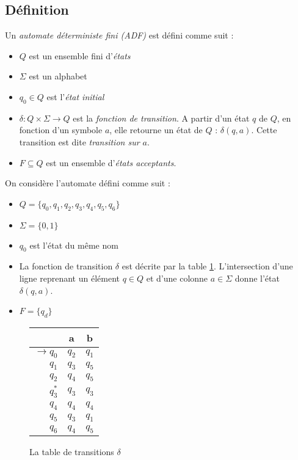 	\subsection{Définition}\label{sub:dfa}
	
	Un \emph{automate déterministe fini (ADF)} \automaton est défini comme suit :
	\begin{itemize}
		\item $Q$ est un ensemble fini d'\emph{états}
		\item $\Sigma$ est un alphabet
		\item $q_0 \in Q$ est l'\emph{état initial}
		\item $\delta : Q \times \Sigma \rightarrow Q$ est la \emph{fonction de transition}. A partir d'un état $q$ de $Q$, en fonction d'un symbole $a$, elle retourne un état de $Q$ : $\delta(q,a)$. Cette transition est dite \emph{transition sur $a$}.
		\item $F \subseteq Q$ est un ensemble d'\emph{états acceptants}.
	\end{itemize}
	
	\begin{example}\label{ex:adf}
		On considère l'automate \automaton défini comme suit :
		\begin{itemize}
			\item $Q=\{q_0,q_1,q_2,q_3,q_4,q_5,q_6\}$
			\item $\Sigma=\{0,1\}$
			\item $q_0$ est l'état du même nom
			\item La fonction de transition $\delta$ est décrite par la table \ref{fig:transdelta}. L'intersection d'une ligne reprenant un élément $q \in Q$ et d'une colonne $a \in \Sigma$ donne l'état $\delta(q,a)$.
			\item $F=\{q_d\}$
		\end{itemize}
	
		\begin{figure}[H]
			\centering
			\begin{tabular}{|r||c|c|}
				\hline
				&a&b\\
				\hline\hline
				$\rightarrow q_0$&$q_2$&$q_1$\\\hline
				$q_1$&$q_3$&$q_5$\\\hline
				$q_2$&$q_4$&$q_5$\\\hline
				$q_3^*$&$q_3$&$q_3$\\\hline
				$q_4$&$q_4$&$q_4$\\\hline
				$q_5$&$q_3$&$q_1$\\\hline
				$q_6$&$q_4$&$q_5$\\\hline
			\end{tabular}
			\caption{La table de transitions $\delta$}
			\label{fig:transdelta}
		\end{figure}
	\end{example}
	 

